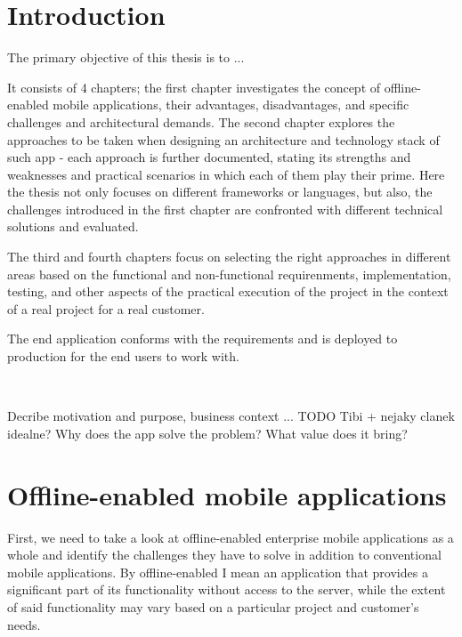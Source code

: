 \documentclass[
  digital,     %
  color,       %
  oneside,     %
  nosansbold,  %
  nocolorbold, %
  lof,         %
  lot,         %
]{fithesis4}
\begin{document}
\chapter*{Introduction}

The primary objective of this thesis is to ...

It consists of 4 chapters; the first chapter investigates the concept of offline-enabled mobile applications, their advantages, disadvantages, and specific challenges and architectural demands. The second chapter explores the approaches to be taken when designing an architecture and technology stack of such app - each approach is further documented, stating its strengths and weaknesses and practical scenarios in which each of them play their prime. Here the thesis not only focuses on different frameworks or languages, but also, the challenges introduced in the first chapter are confronted with different technical solutions and evaluated.

The third and fourth chapters focus on selecting the right approaches in different areas based on the functional and non-functional requirenments, implementation, testing, and other aspects of the practical execution of the project in the context of a real project for a real customer.

The end application conforms with the requirements and is deployed to production for the end users to work with.

~

Decribe motivation and purpose, business context ... TODO Tibi + nejaky clanek idealne?
Why does the app solve the problem? What value does it bring?

\chapter{Offline-enabled mobile applications}
First, we need to take a look at offline-enabled enterprise mobile applications as a whole and identify the challenges they have to solve in addition to conventional mobile applications. By offline-enabled I mean an application that provides a significant part of its functionality without access to the server, while the extent of said functionality may vary based on a particular project and customer's needs.
\end{document}
